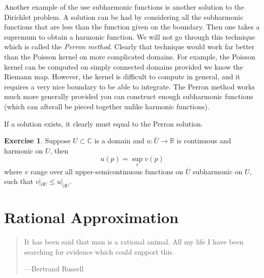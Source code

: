 \documentclass[12pt,openany]{book}
\newcommand{\C}{{\mathbb{C}}}
\newcommand{\R}{{\mathbb{R}}}
\newcommand{\myindex}[1]{#1\index{#1}}
\theoremstyle{plain}
\theoremstyle{remark}
\theoremstyle{definition}
\newenvironment{exbox}{%
    \def\FrameCommand{\vrule width 1pt \relax\hspace{10pt}}%
    \MakeFramed{\advance\hsize-\width\FrameRestore}%
}{%
    \endMakeFramed
}
\newenvironment{myquote}{%
    \begin{quote}%
    \begingroup\itshape
}{%
    \endgroup%
    \end{quote}
}
\theoremstyle{exercise}
\newtheorem{exercise}{Exercise}[section]
\theoremstyle{example}
\begin{document}
Another example of the use subharmonic functions is another solution
to the Dirichlet problem.  A solution can be had by considering all the
subharmonic functions that are less than the function given on the boundary.
Then one takes a supremum to obtain a harmonic function.  We will not go
through this technique which is called the \emph{\myindex{Perron method}}.
Clearly that technique would work far better than the Poisson kernel on
more complicated domains.  For example, the Poisson kernel can be computed
on simply connected domains provided we know the Riemann map.  However,
the kernel is difficult to compute in general, and it requires a very nice
boundary to be able to integrate.  The Perron method works much more
generally provided you can construct enough subharmonic functions (which can
afterall be pieced together unlike harmonic functions).

If a solution exists, it clearly must equal to the Perron solution.

\begin{exbox}
\begin{exercise}
Suppose $U \subset \C$ is a domain and
$u \colon \overline{U} \to \R$ is continuous and
harmonic on $U$, then
\begin{equation*}
u(p) = \sup_{v} v(p)
\end{equation*}
where $v$ range over all upper-semicontinuous functions on $\overline{U}$
subharmonic on $U$,
such that $v|_{\partial U} \leq u|_{\partial U}$.
\end{exercise}
\end{exbox}


\chapter{Rational Approximation} \label{ch:runge}

\begin{myquote}
It has been said that man is a rational animal. All my life I have been searching for evidence which could support this.

---Bertrand Russell
\end{myquote}

\end{document}
